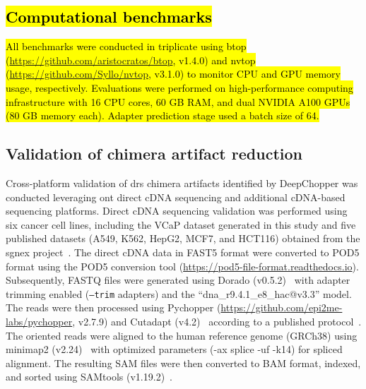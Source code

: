 \documentclass[pdflatex,sn-nature, lineno]{sn-jnl}%
\begin{document}
\subsection{\hl{Computational benchmarks}}

\hl{All benchmarks were conducted in triplicate using btop (\mbox{\url{https://github.com/aristocratos/btop}}, v1.4.0) and nvtop (\mbox{\url{https://github.com/Syllo/nvtop}}, v3.1.0) to monitor CPU and GPU memory usage, respectively. Evaluations were performed on high-performance computing infrastructure with 16 CPU cores, 60 GB RAM, and dual NVIDIA A100 GPUs (80 GB memory each). Adapter prediction stage used a batch size of 64.}


\subsection{Validation of chimera artifact reduction}

Cross-platform validation of \gls{drs} chimera artifacts identified by DeepChopper was conducted leveraging \gls{ont} direct cDNA sequencing and additional cDNA-based sequencing platforms.
Direct cDNA sequencing validation was performed using six cancer cell lines, including the VCaP dataset generated in this study and five published datasets (A549, K562, HepG2, MCF7, and HCT116) obtained from the \gls{sgnex} project~\cite{chen2021systematic}.
The direct cDNA data in FAST5 format were converted to POD5 format using the POD5 conversion tool (\url{https://pod5-file-format.readthedocs.io}).
Subsequently, FASTQ files were generated using Dorado (v0.5.2)~\cite{dorado2023} with adapter trimming enabled (\texttt{--trim} adapters) and the ``dna\_r9.4.1\_e8\_hac@v3.3'' model.
The reads were then processed using Pychopper (\url{https://github.com/epi2me-labs/pychopper}, v2.7.9) and Cutadapt (v4.2)~\cite{martin2011cutadapt} according to a published protocol~\cite{grunberger2022nanopore}.
The oriented reads were aligned to the human reference genome (GRCh38) using minimap2 (v2.24)~\cite{li2018minimap2} with optimized parameters (-ax splice -uf -k14) for spliced alignment.
The resulting SAM files were then converted to BAM format, indexed, and sorted using SAMtools (v1.19.2)~\cite{li2009sequence}.
\end{document}
